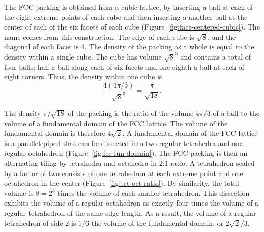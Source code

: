 The FCC packing is obtained from a cubic lattice, by inserting a ball
at each of the eight extreme points of each cube and then inserting a
another ball at the center of each of the six facets of each cube
(Figure~\ref{fig:face-centered-cubic}).  The name
 comes from this construction.  The edge
of each cube is $\sqrt8$, and the diagonal of each facet is $4$.  The
density of the packing as a whole is equal to the density within a
single cube.  The cube has volume $\sqrt8^3$ and contains a total of
four balls: half a ball along each of six facets and one eighth a ball
at each of eight corners.  Thus, the density within one cube is
   \[ 
   \frac{   4 (4\pi/3)}{\sqrt8^3} = \frac{\pi}{\sqrt{18}}.
   \] 


\figTCFVGTS %



The density $\pi/\sqrt{18}$ of the packing is the ratio of the volume
$4\pi/3$ of a ball to the volume of a fundamental domain of the FCC
lattice.  The volume of the fundamental domain is therefore
$4\sqrt{2}$.  A fundamental domain of the FCC lattice is a
parallelepiped that can be dissected into two regular tetrahedra and
one regular octahedron (Figure~\ref{fig:fcc-fun-domain}).  The FCC
packing is then an alternating tiling by tetrahedra and octahedra in
2:1 ratio.  A tetrahedron scaled by a factor of two consists of one
tetrahedron at each extreme point and one octahedron in the center
(Figure~\ref{fig:tet-oct-ratio}). By similarity, the total volume is
$8 = 2^3$ times the volume of each smaller tetrahedron. This
dissection exhibits the volume of a regular octahedron as exactly four
times the volume of a regular tetrahedron of the same edge length.  As
a result, the volume of a regular tetrahedron of side $2$ is $1/6$ the
volume of the fundamental domain, or $2\sqrt{2}/3$.

